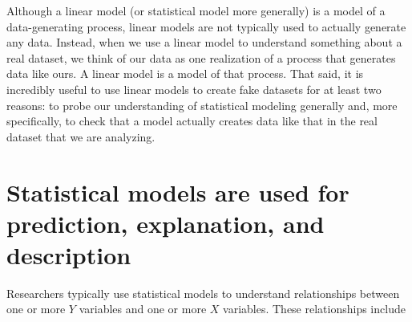 \documentclass[]{book}
\begin{document}
Although a linear model (or statistical model more generally) is a model of a data-generating process, linear models are not typically used to actually generate any data. Instead, when we use a linear model to understand something about a real dataset, we think of our data as one realization of a process that generates data like ours. A linear model is a model of that process. That said, it is incredibly useful to use linear models to create fake datasets for at least two reasons: to probe our understanding of statistical modeling generally and, more specifically, to check that a model actually creates data like that in the real dataset that we are analyzing.

\hypertarget{statistical-models-are-used-for-prediction-explanation-and-description}{%
\section{Statistical models are used for prediction, explanation, and description}\label{statistical-models-are-used-for-prediction-explanation-and-description}}

Researchers typically use statistical models to understand relationships between one or more \(Y\) variables and one or more \(X\) variables. These relationships include
\end{document}
